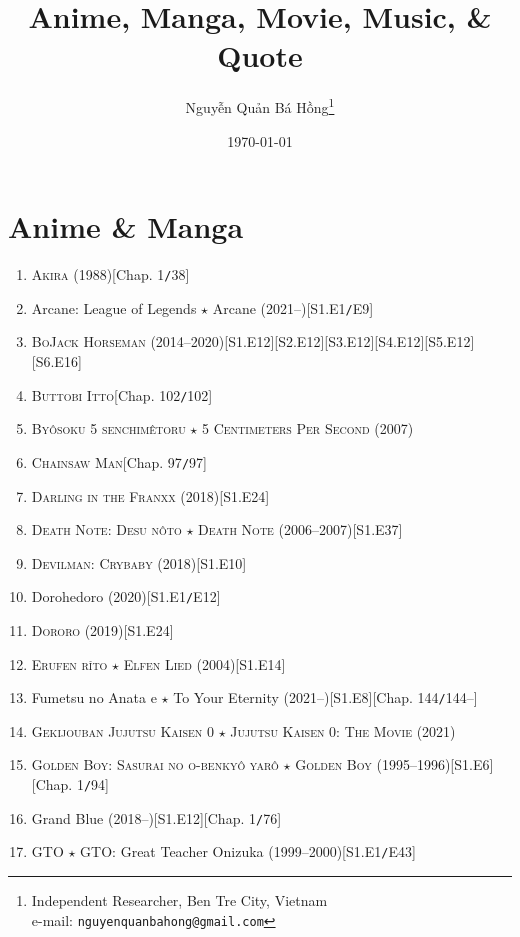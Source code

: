 \documentclass[oneside]{book}
\title{Anime, Manga, Movie, Music, {\large\&} Quote}
\author{\selectlanguage{vietnamese} Nguyễn Quản Bá Hồng\footnote{Independent Researcher, Ben Tre City, Vietnam\\e-mail: \texttt{nguyenquanbahong@gmail.com}}}
\date{\today}
\numberwithin{equation}{section}
\begin{document}
\maketitle
\tableofcontents


\chapter{Anime \& Manga}

\begin{enumerate}
    \item \textsc{Akira} (1988)\hfill[Chap. 1\texttt{/}38]
    \item Arcane: League of Legends $\star$ Arcane (2021--)\hfill[S1.E1\texttt{/}E9]
    \item \textsc{BoJack Horseman} (2014--2020)\hfill[S1.E12][S2.E12][S3.E12][S4.E12][S5.E12][S6.E16]
    \item \textsc{Buttobi Itto}\hfill[Chap. 102\texttt{/}102]
    \item \textsc{By\^osoku 5 senchimêtoru $\star$ 5 Centimeters Per Second} (2007)
    \item \textsc{Chainsaw Man}\hfill[Chap. 97\texttt{/}97]
    \item \textsc{Darling in the Franxx} (2018)\hfill[S1.E24]
    \item \textsc{Death Note: Desu n\^oto $\star$ Death Note} (2006--2007)\hfill[S1.E37]
    \item \textsc{Devilman: Crybaby} (2018)\hfill[S1.E10]
    \item Dorohedoro (2020)\hfill[S1.E1\texttt{/}E12]
    \item \textsc{Dororo} (2019)\hfill[S1.E24]
    \item \textsc{Erufen r\^{\i}to $\star$ Elfen Lied} (2004)\hfill[S1.E14]
    \item Fumetsu no Anata e $\star$ To Your Eternity (2021--)\hfill[S1.E8][Chap. 144\texttt{/}144--]
    \item \textsc{Gekijouban Jujutsu Kaisen 0 $\star$ Jujutsu Kaisen 0: The Movie} (2021)
    \item \textsc{Golden Boy: Sasurai no o-benky\^o yar\^o $\star$ Golden Boy} (1995--1996)\hfill[S1.E6][Chap. 1\texttt{/}94]
    \item Grand Blue (2018--)\hfill[S1.E12][Chap. 1\texttt{/}76]
    \item GTO $\star$ GTO: Great Teacher Onizuka (1999--2000)\hfill[S1.E1\texttt{/}E43]

\end{enumerate}
\end{document}
